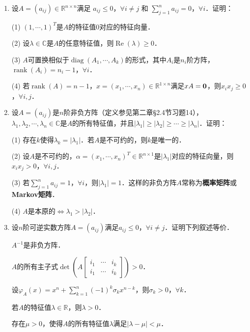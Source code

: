 \documentclass[a4paper,fontset=windows]{ctexbook}
\theoremstyle{definition}
\DeclareMathOperator{\diag}{diag}
\DeclareMathOperator{\rank}{rank}
\DeclareMathOperator{\re}{Re}
\renewcommand{\le}{\leqslant}
\renewcommand{\ge}{\geqslant}
\begin{document}
\begin{enumerate}
\item 设$A=(a_{ij})\in\mathbb{R}^{n\times n}$满足  $a_{ij}\le 0$，$\forall i\ne j$ 和  $\sum\limits_{j=1}^na_{ij}=0$，$\forall i$．证明：

(1) $(1,\cdots,1)^T$是$A$的特征值0对应的特征向量．

(2) 设$\lambda\in\mathbb{C}$是$A$的任意特征值，则$\re(\lambda)\ge 0$．

(3) $A$可置换相似于$\diag(A_1,\cdots,A_k)$的形式，其中$A_i$是$n_i$阶方阵，$\rank(A_i)=n_i-1$，$\forall i$．

(4) 若$\rank(A)=n-1$，$x=(x_1,\cdots,x_n)\in\mathbb{R}^{1\times n}$满足$xA={\bf 0}$，则$x_ix_j\ge 0$，$\forall i,j$．

\item 设$A=(a_{ij})$是$n$阶非负方阵（定义参见第二章\S 2.4节习题14），$\lambda_1,\lambda_2,\cdots,\lambda_n\in\mathbb{C}$是$A$的所有特征值，并且$|\lambda_1|\ge|\lambda_2|\ge\cdots\ge|\lambda_n|$．证明：

(1) 存在$k$使得$\lambda_k=|\lambda_1|$．若$A$是不可约的，则$k$是唯一的．

(2) 设$A$是不可约的，$\alpha=(x_1,\cdots,x_n)^T\in\mathbb{R}^{n\times 1}$是$|\lambda_1|$对应的特征向量，则$x_ix_j>0$，$\forall i,j$．

(3) 若$\sum\limits_{j=1}^na_{ij}=1$，$\forall i$，则$|\lambda_1|=1$．这样的非负方阵$A$常称为{\bf 概率矩阵}或{\bf Markov矩阵}．

(4) $A$是本原的$\Leftrightarrow\lambda_1>|\lambda_2|$．

\item 设$n$阶可逆实数方阵$A=(a_{ij})$满足$a_{ij}\le 0$，$\forall i\ne j$．证明下列叙述等价．

 $A^{-1}$是非负方阵．

 $A$的所有主子式$\det\left(A[\begin{smallmatrix}i_1&\cdots&i_k \\ i_1&\cdots&i_k\end{smallmatrix}]\right)>0$．

 设$\varphi_A(x)=x^n+\sum\limits_{k=1}^n(-1)^k\sigma_kx^{n-k}$，则$\sigma_k>0$，$\forall k$．

 若$A$的特征值$\lambda\in\mathbb{R}$，则$\lambda>0$．

 存在$\mu>0$，使得$A$的所有特征值$\lambda$满足$|\lambda-\mu|<\mu$．

\end{enumerate}
\end{document}
